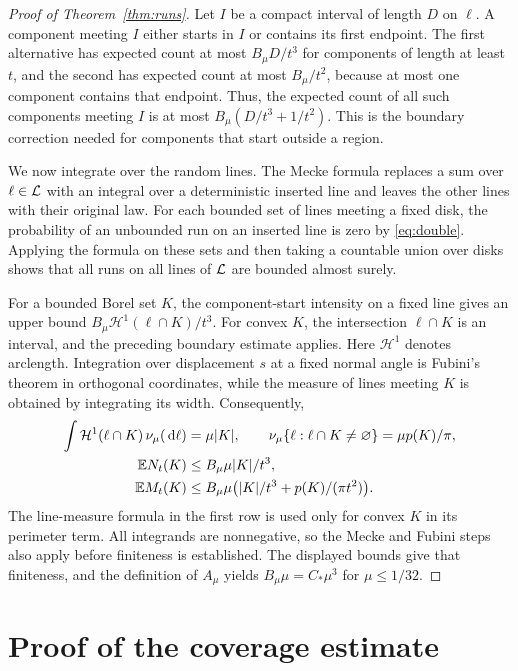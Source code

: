\documentclass[11pt,letterpaper]{article}
\begin{document}
\begin{proof}[Proof of Theorem~\ref{thm:runs}]
Let $I$ be a compact interval of length $D$ on $\ell$. A component meeting $I$ either starts in $I$ or contains its first endpoint. The first alternative has expected count at most $B_\mu D/t^3$ for components of length at least $t$, and the second has expected count at most $B_\mu/t^2$, because at most one component contains that endpoint. Thus, the expected count of all such components meeting $I$ is at most $B_\mu(D/t^3+1/t^2)$. This is the boundary correction needed for components that start outside a region.

We now integrate over the random lines. The Mecke formula \cite[Theorem~4.1]{LP17} replaces a sum over $\ell\in\mathcal L$ with an integral over a deterministic inserted line and leaves the other lines with their original law. For each bounded set of lines meeting a fixed disk, the probability of an unbounded run on an inserted line is zero by \eqref{eq:double}. Applying the formula on these sets and then taking a countable union over disks shows that all runs on all lines of $\mathcal L$ are bounded almost surely.

For a bounded Borel set $K$, the component-start intensity on a fixed line gives an upper bound $B_\mu\mathcal H^1(\ell\cap K)/t^3$. For convex $K$, the intersection $\ell\cap K$ is an interval, and the preceding boundary estimate applies. Here $\mathcal H^1$ denotes arclength. Integration over displacement $s$ at a fixed normal angle is Fubini's theorem in orthogonal coordinates, while the measure of lines meeting $K$ is obtained by integrating its width. Consequently,
\begin{equation}\label{eq:mecke}
\begin{aligned}
 \int\mathcal H^1(\ell\cap K)\,\nu_\mu(\,\mathrm{d}\ell)
   &=\mu|K|,\qquad
   \nu_\mu\{\ell:\ell\cap K\ne\varnothing\}=\mu p(K)/\pi,\\
 \mathbb E N_t(K)&\le B_\mu\mu|K|/t^3,\\
 \mathbb E M_t(K)&\le B_\mu\mu
       \big(|K|/t^3+p(K)/(\pi t^2)\big).
\end{aligned}
\end{equation}
The line-measure formula in the first row is used only for convex $K$ in its perimeter term. All integrands are nonnegative, so the Mecke and Fubini steps also apply before finiteness is established. The displayed bounds give that finiteness, and the definition of $A_\mu$ yields $B_\mu\mu=C_*\mu^3$ for $\mu\le1/32$.
\end{proof}

\section{Proof of the coverage estimate}
\end{document}

